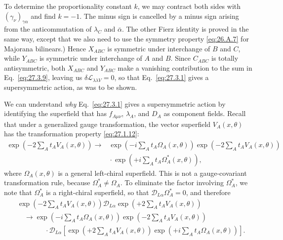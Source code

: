 To determine the proportionality constant \(k\), we may contract both sides
with \((\gamma_\nu)_{\gamma\alpha}\) and find \(k=-1\). The minus sign is
cancelled by a minus sign arising from the anticommutation of \(\lambda_C\)
and \(\bar\alpha\). The other Fierz identity is proved in the same way,
except that we also need to use the symmetry property
\eqref{eq:26.A.7} for Majorana bilinears.) Hence \(X_{ABC}\) is symmetric
under interchange of \(B\) and \(C\), while \(Y_{ABC}\) is symmetric under
interchange of \(A\) and \(B\). Since \(C_{ABC}\) is totally
antisymmetric, both \(X_{ABC}\) and \(Y_{ABC}\) make a vanishing
contribution to the sum in Eq.~\eqref{eq:27.3.9}, leaving us
\(\delta\mathcal{L}_{\lambda\lambda V}=0\), so that
Eq.~\eqref{eq:27.3.1} gives a supersymmetric action, as was to be shown.

We can understand \textit{why} Eq.~\eqref{eq:27.3.1} gives a
supersymmetric action by identifying the superfield that has
\(f_{A\mu\nu}\), \(\lambda_A\), and \(D_A\) as component fields. Recall
that under a generalized gauge transformation, the vector superfield
\(V_A(x,\theta)\) has the transformation property \eqref{eq:27.1.12}:
\begin{equation}
  \begin{aligned}
  \exp\left(-2\sum_A t_A V_A(x,\theta)\right)
  \longrightarrow{}&
  \exp\left(-i\sum_A t_A\Omega_A(x,\theta)\right)
  \exp\left(-2\sum_A t_A V_A(x,\theta)\right)
  \\
  &{}\cdot
  \exp\left(+i\sum_A t_A\Omega_A^*(x,\theta)\right),
  \end{aligned}
  \tag{27.3.10}\label{eq:27.3.10}
\end{equation}
where \(\Omega_A(x,\theta)\) is a general left-chiral superfield. This is
not a gauge-covariant transformation rule, because
\(\Omega_A^*\ne\Omega_A\). To eliminate the factor involving
\(\Omega_A^*\), we note that \(\Omega_A^*\) is a right-chiral superfield,
so that \(\mathcal{D}_{L\alpha}\Omega_A^*=0\), and therefore
\begin{equation}
  \begin{aligned}
  &\exp\left(-2\sum_A t_A V_A(x,\theta)\right)
  \mathcal{D}_{L\alpha}
  \exp\left(+2\sum_A t_A V_A(x,\theta)\right)
  \\
  &\quad\longrightarrow
  \exp\left(-i\sum_A t_A\Omega_A(x,\theta)\right)
  \exp\left(-2\sum_A t_A V_A(x,\theta)\right)
  \\
  &\qquad\qquad{}\cdot
  \mathcal{D}_{L\alpha}\left[
    \exp\left(+2\sum_A t_A V_A(x,\theta)\right)
    \exp\left(+i\sum_A t_A\Omega_A(x,\theta)\right)
  \right].
  \end{aligned}
  \tag{27.3.11}\label{eq:27.3.11}
\end{equation}
